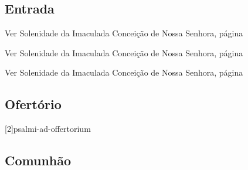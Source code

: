 
\subsection{Entrada}\label{subsection:proprium-sanctorum/in-annuntiatione-domini/introitus}

\begin{rubrica}
    Ver Solenidade da Imaculada Conceição de Nossa Senhora, página~\pageref{subsection:proprium-sanctorum/in-conceptione-immaculata-bmv/psalmus-responsorius}
\end{rubrica}

\begin{rubrica}
    Ver Solenidade da Imaculada Conceição de Nossa Senhora, página~\pageref{subsection:proprium-sanctorum/in-conceptione-immaculata-bmv/alleluia}
\end{rubrica}

\begin{rubrica}
    Ver Solenidade da Imaculada Conceição de Nossa Senhora, página~\pageref{subsection:proprium-sanctorum/in-conceptione-immaculata-bmv/psalmus-alleluiaticus}
\end{rubrica}

\AllowPageFlush

\subsection{Ofertório}\label{subsection:proprium-sanctorum/in-annuntiatione-domini/offertorium}
[2]{psalmi-ad-offertorium}

\subsection{Comunhão}\label{subsection:proprium-sanctorum/in-annuntiatione-domini/communio}
